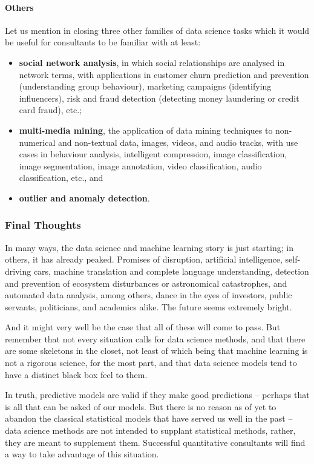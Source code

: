 \paragraph{Others} Let us mention in closing three other families of data science tasks which it would be useful for consultants to be familiar with at least: 
\begin{itemize}[noitemsep]
\item \textbf{social network analysis}, in which social relationships are analysed in network terms, with applications in customer churn prediction and prevention (understanding group behaviour), marketing campaigns (identifying influencers), risk and fraud detection (detecting money laundering or credit card fraud), etc.;
\item \textbf{multi-media mining}, the application of data mining techniques to non-numerical and non-textual data, images, videos, and audio tracks, with use cases in behaviour analysis, intelligent compression, image classification, image segmentation, image annotation, video classification, audio classification, etc., and 
\item \textbf{outlier and anomaly detection}.   
\end{itemize}
\subsubsection{Final Thoughts}
In many ways, the data science and machine learning story is just starting; in others, it has already peaked. Promises of disruption, artificial intelligence, self-driving cars, machine translation and complete language understanding, detection and prevention of ecosystem disturbances or astronomical catastrophes, and automated data analysis, among others, dance in the eyes of investors, public servants, politicians, and academics alike. The future seems extremely bright. \par And it might very well be the case that all of these will come to pass. But remember that not every situation calls for data science methods, and that there are some skeletons in the closet, not least of which being that machine learning is not a rigorous science, for the most part, and that data science models tend to have a distinct black box feel to them. \par In truth, predictive models are valid if they make good predictions -- perhaps that is all that can be asked of our models. But there is no reason as of yet to abandon the classical statistical models that have served us well in the past -- data science methods are not intended to supplant statistical methods, rather, they are meant to supplement them. Successful quantitative consultants will find a way to take advantage of this situation.  

